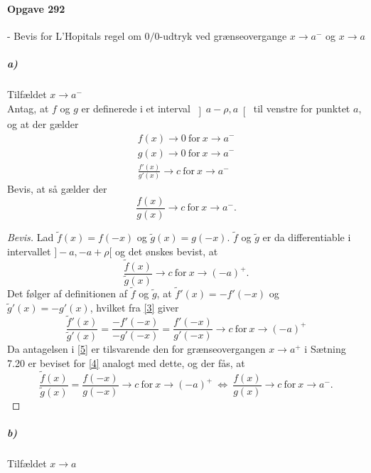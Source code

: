 \documentclass[12pt]{article}
\begin{document}
\maketitle

\paragraph{Opgave 292} - Bevis for L'Hopitals regel om $0/0$-udtryk ved grænseovergange $x \to a^-$ og $x \to a$\\

\subparagraph{a)}  Tilfældet $x \to a^-$ \\
Antag, at $f$ og $g$ er definerede i et interval $\left] a - \rho,a\right[$ til venstre for punktet $a$, og at der gælder
\begin{align}
f(x) \to 0 \ \text{for} \ x \to a^- \label{1}\\
g(x) \to 0 \ \text{for} \ x \to a^- \label{2}\\
\frac{f'(x)}{g'(x)}\to c \ \text{for} \ x \to a^- \label{3}
\end{align}
Bevis, at så gælder der
\begin{equation}
\frac{f(x)}{g(x)} \to c \ \text{for} \ x \to a^-.
\end{equation}
\begin{proof}[Bevis] Lad $\tilde{f}(x)=f(-x)$ og $\tilde{g}(x)=g(-x)$. $\tilde{f}$ og $\tilde{g}$ er da differentiable i intervallet $]-a,-a+\rho[$ og det ønskes bevist, at
\begin{equation}
\frac{\tilde{f}(x)}{\tilde{g}(x)} \to c \ \text{for} \ x \to (-a)^+.
\label{4}
\end{equation}
Det følger af definitionen af $\tilde{f}$ og $\tilde{g}$, at $\tilde{f}'(x)=-f'(-x)$ og $\tilde{g}'(x)=-g'(x)$, hvilket fra \eqref{3} giver
\begin{equation}
\frac{\tilde{f}'(x)}{\tilde{g}'(x)}=\frac{-f'(-x)}{-g'(-x)}=\frac{f'(-x)}{g'(-x)} \to c \ \text{for} \ x \to (-a)^+
\label{5}
\end{equation}
Da antagelsen i \eqref{5} er tilsvarende den for grænseovergangen $x \to a^+$ i Sætning 7.20 er beviset for \eqref{4} analogt med dette, og der fås, at
\begin{equation}
\frac{\tilde{f}(x)}{\tilde{g}(x)}=\frac{f(-x)}{g(-x)}\to c \ \text{for} \ x \to (-a)^+ \ \Leftrightarrow \ \frac{f(x)}{g(x)} \to c \ \text{for} \ x \to a^-.
\end{equation}
\end{proof}
\subparagraph{b)}  Tilfældet $x \to a$ \\
\end{document}

